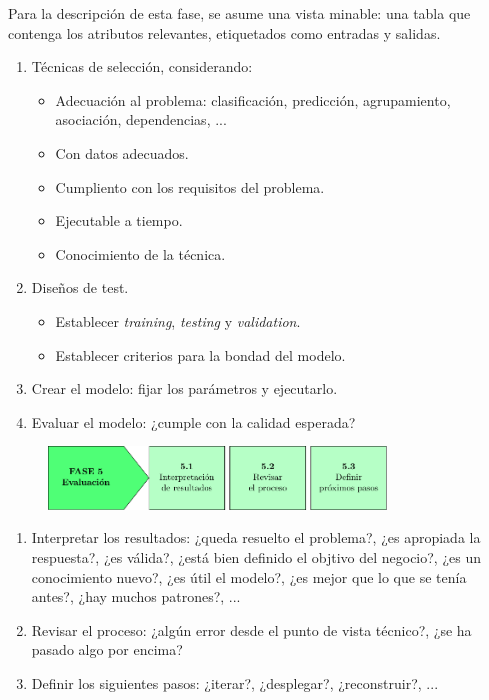 Para la descripción de esta fase, se asume una vista minable: una tabla que contenga los atributos relevantes, etiquetados como entradas y salidas. 

\begin{enumerate}[label=4.\arabic*]
\item Técnicas de selección, considerando:
\begin{itemize}
\item Adecuación al problema: clasificación, predicción, agrupamiento, asociación, dependencias, ...
\item Con datos adecuados.
\item Cumpliento con los requisitos del problema.
\item Ejecutable a tiempo. 
\item Conocimiento de la técnica.
\end{itemize}
\item Diseños de test.
\begin{itemize}
\item Establecer \textit{training}, \textit{testing} y \textit{validation}.
\item Establecer criterios para la bondad del modelo. 
\end{itemize}
\item Crear el modelo: fijar los parámetros y ejecutarlo.
\item Evaluar el modelo: ¿cumple con la calidad esperada? 
\end{enumerate}

\begin{figure}[H]
\centering
\includegraphics[width=0.8\textwidth]{fotos/17.pdf}
\end{figure}

\begin{enumerate}[label=5.\arabic*]
\item Interpretar los resultados: ¿queda resuelto el problema?, ¿es apropiada la respuesta?, ¿es válida?, ¿está bien definido el objtivo del negocio?, ¿es un conocimiento nuevo?, ¿es útil el modelo?, ¿es mejor que lo que se tenía antes?, ¿hay muchos patrones?, ... 
\item Revisar el proceso: ¿algún error desde el punto de vista técnico?, ¿se ha pasado algo por encima?
\item Definir los siguientes pasos: ¿iterar?, ¿desplegar?, ¿reconstruir?, ...
\end{enumerate}


